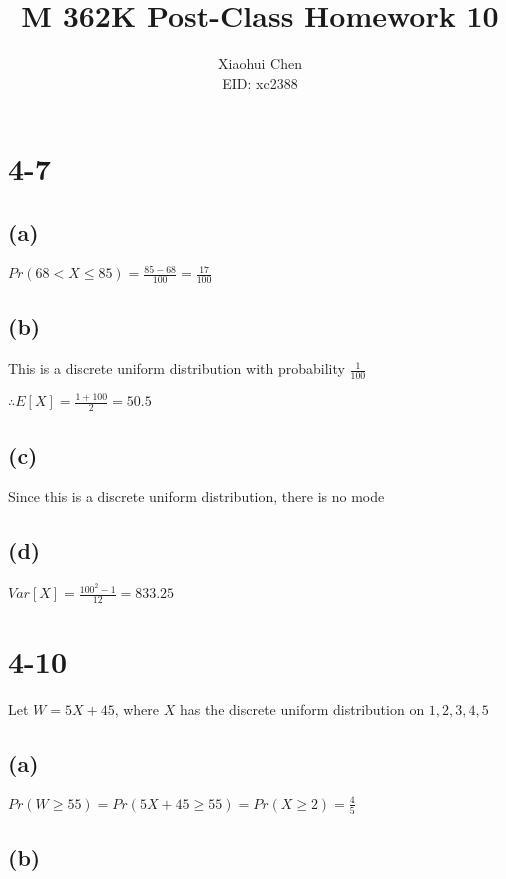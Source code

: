 \documentclass[12pt]{article}
\author{Xiaohui Chen \\EID: xc2388}
\title{M 362K Post-Class Homework 10}
\begin{document}
\maketitle
\begin{spacing}{2.0}

\section*{4-7}

\subsection*{(a)}

$Pr(68<X\le 85)= \frac{85-68}{100}= \frac{17}{100}$

\subsection*{(b)}

This is a discrete uniform distribution with probability $\frac{1}{100}$

$\therefore E[X]= \frac{1+100}{2}=50.5$

\subsection*{(c)}

Since this is a discrete uniform distribution, there is no mode

\subsection*{(d)}

$Var[X]=\frac{100^2-1}{12}=833.25$

\section*{4-10}

Let $W=5X+45$, where $X$ has the discrete uniform distribution on $1,2,3,4,5$

\subsection*{(a)}

$Pr(W\ge 55)= Pr(5X+45 \ge55)= Pr(X\ge 2)= \frac{4}{5}$

\subsection*{(b)}


\end{spacing}
\end{document}
